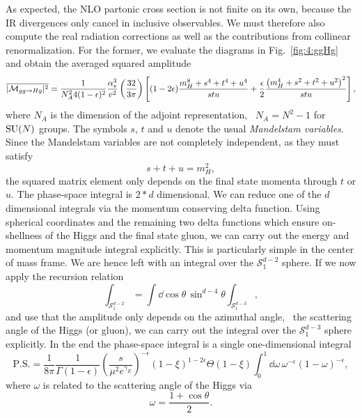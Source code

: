 As expected, the \acs{NLO} partonic cross section is not finite on its own, because the \acs{IR} divergences only cancel in inclusive observables. We must therefore also compute the real radiation corrections as well as the contributions from collinear renormalization. For the former, we evaluate the diagrams in Fig.~\ref{fig:4:ggHg} and obtain the averaged squared amplitude
\begin{equation}
\overline{|\mathcal{M}_{gg \rightarrow H g}|^2} = \frac{1}{N_A^2 4 (1 - \epsilon)^2} \frac{\alpha_s^3}{v^2} \left(\frac{32}{3 \pi} \right) \left[ (1 - 2 \epsilon) \frac{m_H^8 + s^4 + t^4 + u^4}{stu} + \frac{\epsilon}{2} \frac{\left(m_H^4 + s^2 + t^2 + u^2 \right)^2}{stu} \right],
\label{eq:4:ggHg_Amp}
\end{equation}
where $N_A$ is the dimension of the adjoint representation, \ie\ $N_A = N^2 - 1$ for $\mathrm{SU}(N)$ groups. The symbols $s$, $t$ and $u$ denote the usual \textit{Mandelstam variables}. Since the Mandelstam variables are not completely independent, as they must satisfy
\begin{equation}
  s + t + u = m_H^2,
\end{equation}
the squared matrix element only depends on the final state momenta through $t$ or $u$. The phase-space integral is $2*d$ dimensional. We can reduce one of the $d$ dimensional integrals via the momentum conserving delta function. Using spherical coordinates and the remaining two delta functions which ensure on-shellness of the Higgs and the final state gluon, we can carry out the energy and momentum magnitude integral explicitly. This is particularly simple in the center of mass frame. We are hence left with an integral over the $\mathcal{S}_1^{d - 2}$ sphere. If we now apply the recursion relation
\begin{equation}
\int_{\mathcal{S}_1^{d - 2}} = \int \dd\!\cos \theta \, \sin^{d - 4} \theta \int_{\mathcal{S}_1^{d - 3}},
\end{equation}
and use that the amplitude only depends on the azimuthal angle, \ie\ the scattering angle of the Higgs (or gluon), we can carry out the integral over the $\mathcal{S}_1^{d - 3}$ sphere explicitly. In the end the phase-space integral is a single one-dimensional integral
\begin{equation}
\text{P.S.} = \frac{1}{8 \pi} \frac{1}{\Gamma (1 - \epsilon)} \left(\frac{s}{\mu^2 e^{\gamma_E}}\right)^{-\epsilon} \left(1 - \xi \right)^{1 - 2 \epsilon} \Theta (1 - \xi) \int_0^1 \dd \omega \, \omega^{-\epsilon} (1 - \omega)^{-\epsilon},
\label{eq:4:PS_measure}
\end{equation}
where $\omega$ is related to the scattering angle of the Higgs via
\begin{equation}
\omega = \frac{1 + \cos \theta}{2}.
\end{equation}

